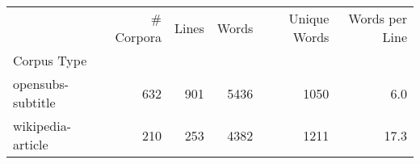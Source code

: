\begin{tabular}{lrrrrr}
\toprule
 & \# Corpora & Lines & Words & Unique Words & Words per Line \\
Corpus Type &  &  &  &  &  \\
\midrule
opensubs-subtitle & 632 & 901 & 5436 & 1050 & 6.0 \\
wikipedia-article & 210 & 253 & 4382 & 1211 & 17.3 \\
\bottomrule
\end{tabular}
